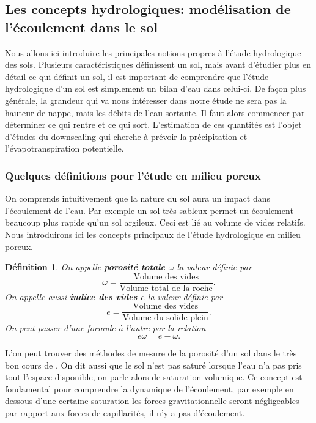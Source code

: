 \documentclass[a4paper,11pt]{article}
\numberwithin{equation}{section}
\newtheorem{definition}{Définition}
\begin{document}
\subsection{Les concepts hydrologiques: modélisation de l'écoulement dans le sol}
\label{hydro}

Nous allons ici introduire les principales notions propres à l'étude hydrologique des sols. Plusieurs caractéristiques définissent un sol, mais avant d'étudier  plus en détail ce qui définit un sol, il est important de comprendre que l'étude hydrologique d'un sol est simplement un bilan d'eau dans celui-ci. De façon plus générale, la grandeur qui va nous intéresser dans notre étude ne sera pas la hauteur de nappe, mais les débits de l'eau sortante.
Il faut alors commencer par déterminer ce qui rentre et ce qui sort. L'estimation de ces quantités est l'objet d'études du downscaling qui cherche à prévoir la précipitation et l'évapotranspiration potentielle.

\subsubsection{Quelques définitions pour l'étude en milieu poreux}
\label{ch: definition milieu poreux}
On comprends intuitivement que la nature du sol aura un impact dans l'écoulement de l'eau. Par exemple un sol très sableux permet un écoulement beaucoup plus rapide qu'un sol argileux. Ceci est lié au volume de vides relatifs. Nous introduirons ici les concepts principaux de l'étude hydrologique en milieu poreux.

\begin{definition}
	\label{def:porosite}
	On appelle \textbf{porosité totale $\omega$} la valeur définie par
	\begin{equation}
		\omega =\frac{\textrm{Volume des vides}}{\textrm{Volume total de la roche}}.
	\end{equation}
	On appelle aussi \textbf{indice des vides $e$} la valeur définie par 
	\begin{equation}
		e=\frac{\textrm{Volume des vides}}{\textrm{Volume du solide plein}}.
	\end{equation}
	On peut passer d'une formule à l'autre par la relation 
	\[e\omega=e-\omega.\]
\end{definition}
L'on peut trouver des méthodes de mesure de la porosité d'un sol dans le très bon cours de \cite{marsily_de1986quantitative}. On dit aussi que le sol n'est pas saturé lorsque l'eau n'a pas pris tout l'espace disponible, on parle alors de saturation volumique. Ce concept est fondamental pour comprendre la dynamique de l'écoulement, par exemple en dessous d'une certaine saturation les forces gravitationnelle seront négligeables par rapport aux forces de capillarités, il n'y a pas d'écoulement.
 
\end{document}
